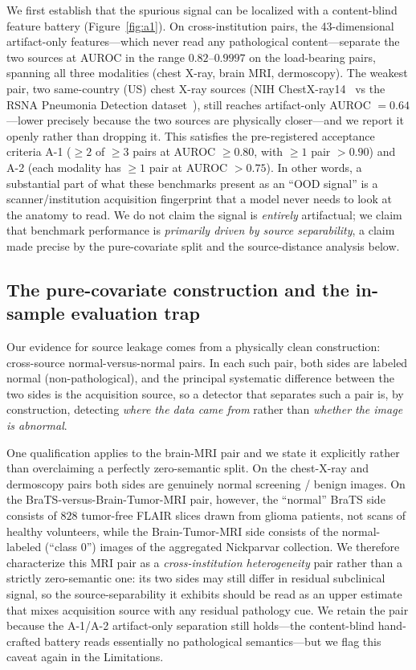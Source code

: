 \documentclass{article}
\begin{document}
We first establish that the spurious signal can be localized with a content-blind
feature battery (Figure~\ref{fig:a1}). On cross-institution pairs, the
43-dimensional artifact-only features---which never read any pathological
content---separate the two sources at AUROC in the range $0.82$--$0.9997$ on the
load-bearing pairs, spanning all three modalities (chest X-ray, brain MRI,
dermoscopy). The weakest pair, two same-country (US) chest X-ray sources
(NIH ChestX-ray14~\citep{wang2017chestxray8} vs the RSNA Pneumonia Detection
dataset~\citep{rsna2018pneumonia,shih2019augmenting}), still reaches
artifact-only AUROC $=0.64$---lower precisely because the
two sources are physically closer---and we report it openly rather than dropping
it. This satisfies the pre-registered acceptance criteria A-1 ($\ge 2$ of $\ge 3$
pairs at AUROC $\ge 0.80$, with $\ge 1$ pair $>0.90$) and A-2 (each modality has
$\ge 1$ pair at AUROC $>0.75$). In other words, a substantial part of what these
benchmarks present as an ``OOD signal'' is a scanner/institution acquisition
fingerprint that a model never needs to look at the anatomy to read. We do not
claim the signal is \emph{entirely} artifactual; we claim that benchmark
performance is \emph{primarily driven by source separability}, a claim made
precise by the pure-covariate split and the source-distance analysis below.

\subsection{The pure-covariate construction and the in-sample evaluation trap}

Our evidence for source leakage comes from a physically clean construction:
cross-source normal-versus-normal pairs. In each such pair, both sides are
labeled normal (non-pathological), and the principal systematic difference
between the two sides is the acquisition source, so a detector that separates
such a pair is, by construction, detecting \emph{where the data came from} rather
than \emph{whether the image is abnormal}.

One qualification applies to the brain-MRI pair and we state it explicitly rather
than overclaiming a perfectly zero-semantic split. On the chest-X-ray and
dermoscopy pairs both sides are genuinely normal screening / benign images. On
the BraTS-versus-Brain-Tumor-MRI pair, however, the ``normal'' BraTS side
consists of $828$ tumor-free FLAIR slices drawn from glioma patients, not scans
of healthy volunteers, while the Brain-Tumor-MRI side consists of the
normal-labeled (``class 0'') images of the aggregated Nickparvar collection. We
therefore characterize this MRI pair as a \emph{cross-institution heterogeneity}
pair rather than a strictly zero-semantic one: its two sides may still differ in
residual subclinical signal, so the source-separability it exhibits should be
read as an upper estimate that mixes acquisition source with any residual
pathology cue. We retain the pair because the A-1/A-2 artifact-only separation
still holds---the content-blind hand-crafted battery reads essentially no
pathological semantics---but we flag this caveat again in the Limitations.
\end{document}
